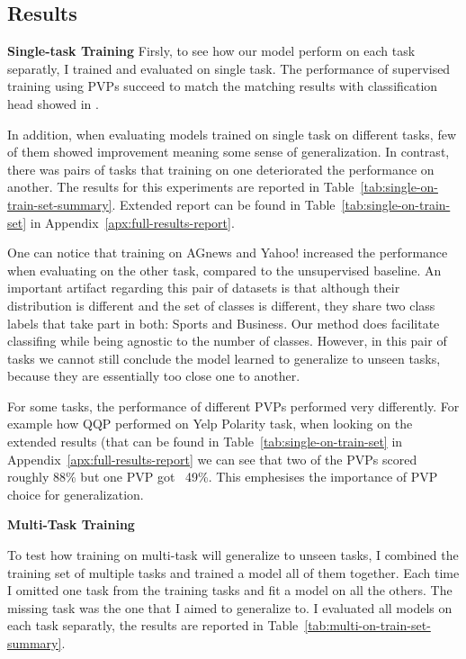 \documentclass[11pt,a4paper]{article}
\begin{document}
\subsection{Results}

\noindent\textbf{Single-task Training}\quad
Firsly, to see how our model perform on each task separatly, I trained and evaluated on single task.
The performance of supervised training using PVPs succeed to match the matching results with classification head showed in \citet{schick2020exploiting}.

In addition, when evaluating models trained on single task on different tasks, few of them showed improvement meaning some sense of generalization.
In contrast, there was pairs of tasks that training on one deteriorated the performance on another.
The results for this experiments are reported in Table~\ref{tab:single-on-train-set-summary}.
Extended report can be found in Table~\ref{tab:single-on-train-set} in Appendix~\ref{apx:full-results-report}.

One can notice that training on AGnews and Yahoo! increased the performance when evaluating on the other task, compared to the unsupervised baseline.
An important artifact regarding this pair of datasets is that although their distribution is different and the set of classes is different, they share two class labels that take part in both: Sports and Business.
Our method does facilitate classifing while being agnostic to the number of classes.
However, in this pair of tasks we cannot still conclude the model learned to generalize to unseen tasks, because they are essentially too close one to another.

For some tasks, the performance of different PVPs performed very differently.
For example how QQP performed on Yelp Polarity task, when looking on the extended results (that can be found in Table~\ref{tab:single-on-train-set} in Appendix~\ref{apx:full-results-report} we can see that two of the PVPs scored roughly 88\% but one PVP got ~49\%.
This emphesises the importance of PVP choice for generalization.

\vspace{8pt}
\noindent\textbf{Multi-Task Training}\quad

To test how training on multi-task will generalize to unseen tasks, I combined the training set of multiple tasks and trained a model all of them together.
Each time I omitted one task from the training tasks and fit a model on all the others.
The missing task was the one that I aimed to generalize to.
I evaluated all models on each task separatly, the results are reported in Table~\ref{tab:multi-on-train-set-summary}.
\end{document}
